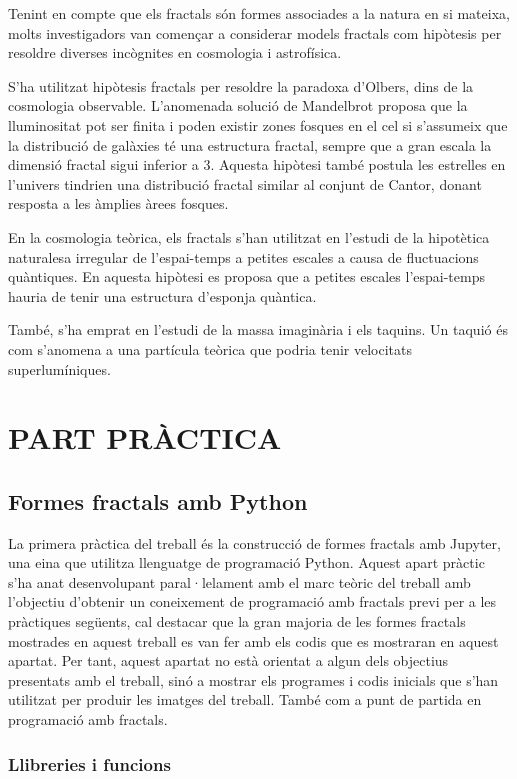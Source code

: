 \documentclass[12pt,a4paper]{report}
\begin{document}
Tenint en compte que els fractals són formes associades a la natura en si mateixa, molts investigadors van començar a considerar models fractals com hipòtesis per resoldre diverses incògnites en cosmologia i astrofísica.

S'ha utilitzat hipòtesis fractals per resoldre la paradoxa d'Olbers, dins de la cosmologia observable. L'anomenada  solució de Mandelbrot proposa  que la lluminositat pot ser finita i poden existir zones fosques en el cel si s'assumeix que la distribució de galàxies té una estructura fractal, sempre que a gran escala la dimensió fractal sigui inferior a 3.  Aquesta hipòtesi també postula les estrelles en l'univers tindrien una distribució  fractal similar al conjunt de Cantor, donant resposta a les àmplies àrees fosques.

En la cosmologia teòrica, els fractals s'han utilitzat en l'estudi de la hipotètica naturalesa irregular de l'espai-temps a petites escales a causa de fluctuacions quàntiques. En aquesta hipòtesi es proposa que a petites escales  l'espai-temps hauria de tenir una estructura d'esponja quàntica.  

També, s'ha emprat en l'estudi de la massa imaginària i els taquins. Un taquió és com s'anomena a una partícula teòrica que podria tenir velocitats superlumíniques.

\chapter{PART PRÀCTICA}
\section{Formes fractals amb Python}\label{forms_fractals}

La primera pràctica del treball és la construcció de formes fractals amb Jupyter, una eina que utilitza llenguatge de programació Python. Aquest apart pràctic s'ha anat desenvolupant paral·lelament amb el marc teòric del treball amb l'objectiu d'obtenir un coneixement de programació amb fractals previ per a les pràctiques següents, cal destacar que la gran majoria de les formes fractals mostrades en aquest treball es van fer amb els codis que es mostraran en aquest apartat. Per tant, aquest apartat no està orientat a algun dels objectius presentats amb el treball, sinó a mostrar els programes i codis inicials que s'han utilitzat per produir les imatges del treball. També com a punt de partida en programació amb fractals. 

\subsection{Llibreries i funcions}
\end{document}
